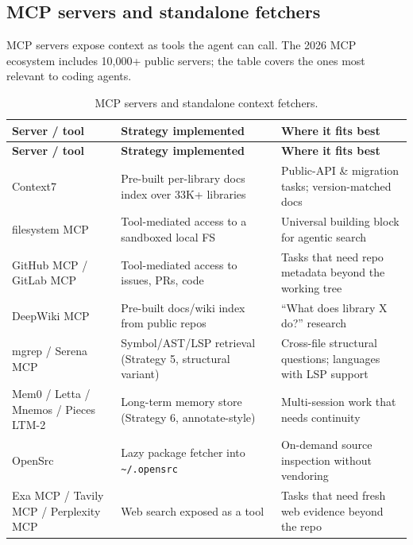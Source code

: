 \documentclass[
  11pt,
  letterpaper,
  numbers=noendperiod,
  parskip=half]{scrartcl}
\begin{document}
\subsection{MCP servers and standalone fetchers}\label{sec-tools-mcp}

MCP servers expose context as tools the agent can call. The 2026 MCP
ecosystem includes 10{,}000+ public servers; the table covers the
ones most relevant to coding agents.

\begin{longtable}[]{@{}
  >{\raggedright\arraybackslash}p{}
  >{\raggedright\arraybackslash}p{}
  >{\raggedright\arraybackslash}p{}@{}}
\caption{MCP servers and standalone context fetchers.}\label{tbl-tools-mcp}\tabularnewline
\toprule\noalign{}
\textbf{Server / tool} & \textbf{Strategy implemented} & \textbf{Where it fits best}\\
\midrule\noalign{}
\endfirsthead
\toprule\noalign{}
\textbf{Server / tool} & \textbf{Strategy implemented} & \textbf{Where it fits best}\\
\midrule\noalign{}
\endhead
\bottomrule\noalign{}
\endlastfoot
Context7 & Pre-built per-library docs index over 33K+ libraries & Public-API \& migration tasks; version-matched docs\\
filesystem MCP & Tool-mediated access to a sandboxed local FS & Universal building block for agentic search\\
GitHub MCP / GitLab MCP & Tool-mediated access to issues, PRs, code & Tasks that need repo metadata beyond the working tree\\
DeepWiki MCP & Pre-built docs/wiki index from public repos & ``What does library X do?'' research\\
mgrep / Serena MCP & Symbol/AST/LSP retrieval (Strategy 5, structural variant) & Cross-file structural questions; languages with LSP support\\
Mem0 / Letta / Mnemos / Pieces LTM-2 & Long-term memory store (Strategy 6, annotate-style) & Multi-session work that needs continuity\\
OpenSrc & Lazy package fetcher into \texttt{\~{}/.opensrc} & On-demand source inspection without vendoring\\
Exa MCP / Tavily MCP / Perplexity MCP & Web search exposed as a tool & Tasks that need fresh web evidence beyond the repo\\
\end{longtable}
\end{document}
